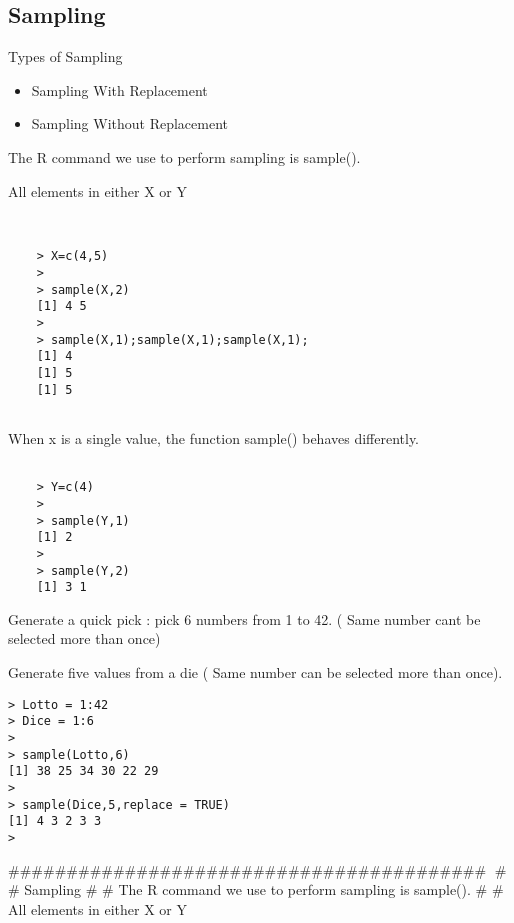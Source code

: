 \documentclass[a4paper,12pt]{article}
\begin{document}
\subsection{Sampling}

Types of Sampling
\begin{itemize}
	\item Sampling With Replacement
	\item Sampling Without Replacement
\end{itemize}

The R command we use to perform sampling is sample().

All elements in either X or Y

\begin{framed}
	\begin{verbatim}
	
	
	> X=c(4,5)
	>
	> sample(X,2)
	[1] 4 5
	>
	> sample(X,1);sample(X,1);sample(X,1);
	[1] 4
	[1] 5
	[1] 5
	
	\end{verbatim}
\end{framed}
When x is a single value, the function sample() behaves differently.

\begin{framed}
	\begin{verbatim}
	
	> Y=c(4)
	>
	> sample(Y,1)
	[1] 2
	> 
	> sample(Y,2)
	[1] 3 1
	\end{verbatim}
\end{framed}


Generate a quick pick : pick 6 numbers from 1 to 42. ( Same number cant be selected more than once)

Generate five values from a die ( Same number can be selected more than once).

\begin{verbatim}
> Lotto = 1:42
> Dice = 1:6
> 
> sample(Lotto,6)
[1] 38 25 34 30 22 29
> 
> sample(Dice,5,replace = TRUE)
[1] 4 3 2 3 3
>
\end{verbatim}






#########################################
# 
# Sampling
# 
# The R command we use to perform sampling is sample().
# 
# All elements in either X or Y
\end{document}
